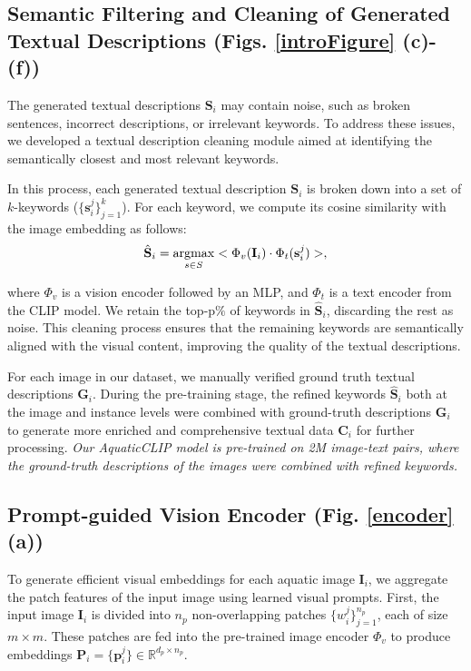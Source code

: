 \subsection{Semantic Filtering and Cleaning of Generated Textual Descriptions (Figs. \ref{introFigure} (c)-(f))}
\label{sec:cleaning}
The generated textual descriptions $\textbf{S}_{i}$ may contain noise, such as broken sentences, incorrect descriptions, or irrelevant keywords. 
To address these issues, we developed a textual description cleaning module aimed at identifying the semantically closest and most relevant keywords.

In this process, each generated textual description $\textbf{S}_{i}$ is broken down into a set of $k$-keywords ($\{\textbf{s}_{i}^{j}\}_{j=1}^{k}$).
For each keyword, we compute its cosine similarity with the image embedding as follows:
\begin{equation}
\hat{\textbf{S}}_{i}= \operatorname*{argmax}_{s\in S}< \Phi_{v}(\textbf{I}_{i})\cdot  \Phi_{t}(\textbf{s}_{i}^{j})>, 
\label{eqn1}
\end{equation}

\noindent where $\Phi_{v}$ is a vision encoder followed by an MLP, and $\Phi_{t}$ is a text encoder from the CLIP model. 
We retain the top-p$\%$ of keywords in $\hat{\textbf{S}}_{i}$, discarding the rest as noise. 
This cleaning process ensures that the remaining keywords are semantically aligned with the visual content, improving the quality of the textual descriptions.


For each image in our dataset, we manually verified ground truth textual descriptions $\textbf{G}_{i}$. 
During the pre-training stage, the refined keywords $\hat{\textbf{S}}_{i}$ both at the image and instance levels were combined with ground-truth descriptions $\textbf{G}_{i}$ to generate more enriched and comprehensive textual data $\textbf{C}_{i}$ for further processing. 
\textit{Our AquaticCLIP model is pre-trained on 2M image-text pairs, where the ground-truth descriptions of the images were combined with refined keywords.}

\subsection{Prompt-guided Vision Encoder (Fig. \ref{encoder} (a))}
\label{sec:pgve}
To generate efficient visual embeddings for each aquatic image $\textbf{I}_{i}$, we aggregate the patch features of the input image using learned visual prompts. 
First, the input image $\textbf{I}_{i}$ is divided into $n_{p}$ non-overlapping patches $\{w_{i}^{j}\}_{j=1}^{n_{p}}$, each of size $m \times m$.
These patches are fed into the pre-trained image encoder $\Phi_{v}$ to produce embeddings $\textbf{P}_i=\{\textbf{p}_{i}^{j}\}\in \mathbb{R}^{d_{p} \times n_p}$.

